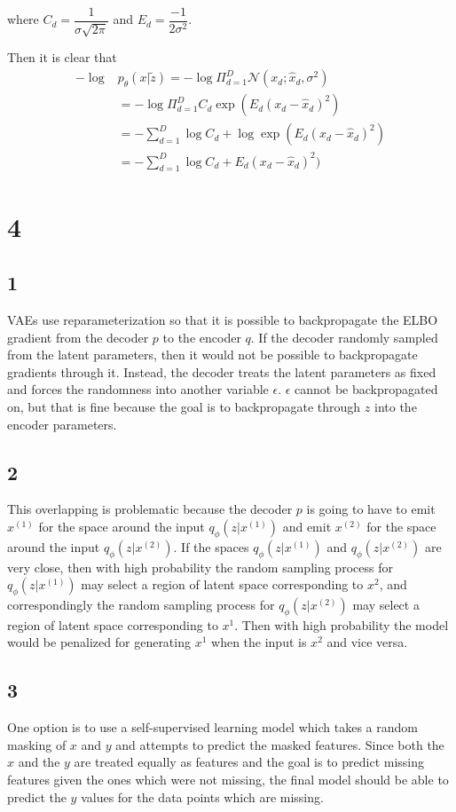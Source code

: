 \documentclass{article}
\begin{document}
where $C_d = \dfrac{1}{\sigma \sqrt{2\pi}}$ and $E_d = \dfrac{-1}{2\sigma^2}$.

Then it is clear that 
\begin{align}
-\log &p_\theta(x|\tilde{z}) = -\log \Pi_{d=1}^D \mathcal{N}(x_d;\hat{x}_d, \sigma^2) \\
&= -\log \Pi_{d=1}^D C_d \exp(E_d(x_d - \hat{x}_d)^2) \\ 
&= -\sum_{d=1}^D \log C_d + \log \exp(E_d(x_d - \hat{x}_d)^2) \\ 
&= -\sum_{d=1}^D \log C_d + E_d(x_d - \hat{x}_d)^2)
\end{align}

\section{4}
\subsection{1}
VAEs use reparameterization so that it is possible to backpropagate the ELBO gradient from the decoder $p$ to the encoder $q$. If the decoder randomly sampled from the latent parameters, then it would not be possible to backpropagate gradients through it. Instead, the decoder treats the latent parameters as fixed and forces the randomness into another variable $\epsilon$. $\epsilon$ cannot be backpropagated on, but that is fine because the goal is to backpropagate through $z$ into the encoder parameters.

\subsection{2}
This overlapping is problematic because the decoder $p$ is going to have to emit $x^{(1)}$ for the space around the input $q_\phi(z|x^{(1)})$ and emit $x^{(2)}$ for the space around the input $q_\phi(z|x^{(2)})$. If the spaces $q_\phi(z|x^{(1)})$ and $q_\phi(z|x^{(2)})$ are very close, then with high probability the random sampling process for $q_\phi(z|x^{(1)})$ may select a region of latent space corresponding to $x^2$, and correspondingly the random sampling process for $q_\phi(z|x^{(2)})$ may select a region of latent space corresponding to $x^1$. Then with high probability the model would be penalized for generating $x^1$ when the input is $x^2$ and vice versa.

\subsection{3}
One option is to use a self-supervised learning model which takes a random masking of $x$ and $y$ and attempts to predict the masked features. Since both the $x$ and the $y$ are treated equally as features and the goal is to predict missing features given the ones which were not missing, the final model should be able to predict the $y$ values for the data points which are missing.
\end{document}
